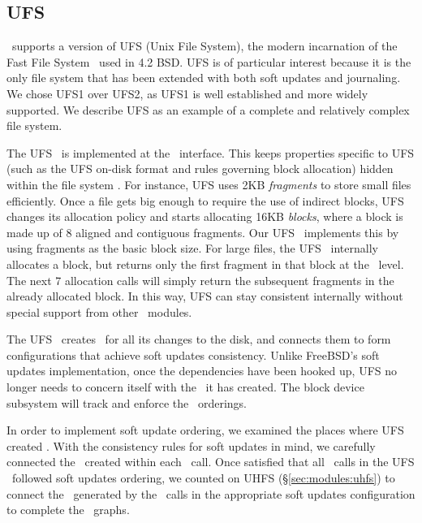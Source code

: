 \subsection{UFS}
\label{sec:using:ufs}

\Kudos\ supports a version of UFS (Unix File System), the modern incarnation of
the Fast File System~\cite{mckusick84fast} used in 4.2 BSD. UFS is of
particular interest because it is the only file system that has been extended
with both soft updates and journaling.~\cite{seltzer00journaling} We chose UFS1
over UFS2, as UFS1 is well established and more widely supported. We describe
UFS as an example of a complete and relatively complex file system.

The UFS \module\ is implemented at the \LFS\ interface. This keeps properties
specific to UFS (such as the UFS on-disk format and rules governing block
allocation) hidden within the file system \module. For instance, UFS uses 2KB
\emph{fragments} to store small files efficiently. Once a file gets big enough
to require the use of indirect blocks, UFS changes its allocation policy and
starts allocating 16KB \emph{blocks}, where a block is made up of 8 aligned and
contiguous fragments. Our UFS \module\ implements this by using fragments as
the basic block size. For large files, the UFS \module\ internally allocates a
block, but returns only the first fragment in that block at the \LFS\ level.
The next 7 allocation calls will simply return the subsequent fragments in the
already allocated block. In this way, UFS can stay consistent internally
without special support from other \Kudos\ modules.

The UFS \module\ creates \chdescs\ for all its changes to the disk, and
connects them to form configurations that achieve soft updates consistency.
Unlike FreeBSD's soft updates implementation, once the dependencies have been
hooked up, UFS no longer needs to concern itself with the \chdescs\ it has
created. The block device subsystem will track and enforce the \chdesc\
orderings.

In order to implement soft update ordering, we examined the places where UFS
created \chdescs. With the consistency rules for soft updates in mind, we
carefully connected the \chdescs\ created within each \LFS\ call. Once
satisfied that all \LFS\ calls in the UFS \module\ followed soft updates
ordering, we counted on UHFS (\S\ref{sec:modules:uhfs}) to connect the
\chdescs\ generated by the \LFS\ calls in the appropriate soft updates
configuration to complete the \chdesc\ graphs.

